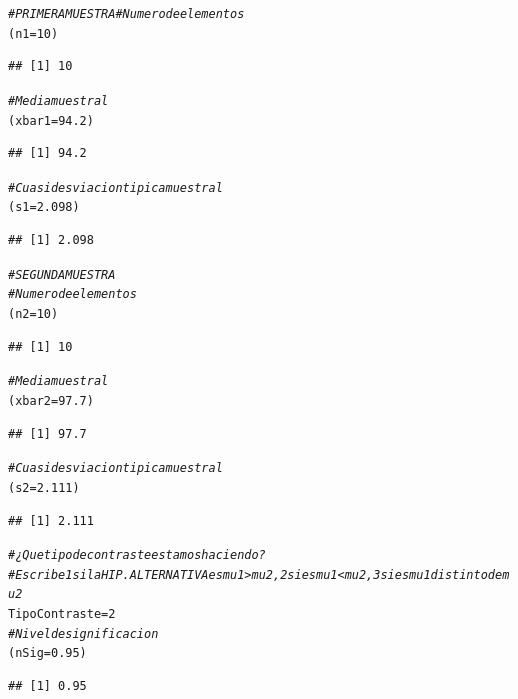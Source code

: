 \documentclass[10pt,a4paper]{article}\usepackage[]{graphicx}\usepackage[]{color}
\makeatletter
\newcommand{\hlnum}[1]{\textcolor[rgb]{0.686,0.059,0.569}{#1}}%
\newcommand{\hlcom}[1]{\textcolor[rgb]{0.678,0.584,0.686}{\textit{#1}}}%
\newcommand{\hlstd}[1]{\textcolor[rgb]{0.345,0.345,0.345}{#1}}%
\newcommand{\hlkwb}[1]{\textcolor[rgb]{0.69,0.353,0.396}{#1}}%
\newenvironment{kframe}{%
 \def\at@end@of@kframe{}%
 \ifinner\ifhmode%
  \def\at@end@of@kframe{\end{minipage}}%
  \begin{minipage}{\columnwidth}%
 \fi\fi%
 \def\FrameCommand##1{\hskip\@totalleftmargin \hskip-\fboxsep
 \colorbox{shadecolor}{##1}\hskip-\fboxsep
     \hskip-\linewidth \hskip-\@totalleftmargin \hskip\columnwidth}%
 \MakeFramed {\advance\hsize-\width
   \@totalleftmargin\z@ \linewidth\hsize
   \@setminipage}}%
 {\par\unskip\endMakeFramed%
 \at@end@of@kframe}
\newenvironment{knitrout}{}{} %
\newcounter {cont01}
\makeatother
\begin{document}
\begin{knitrout}
\color{fgcolor}\begin{kframe}
\begin{alltt}
 \hlcom{# PRIMERA MUESTRA # Numero de elementos}
 \hlstd{(n1} \hlkwb{=} \hlnum{10}\hlstd{)}
\end{alltt}
\begin{verbatim}
## [1] 10
\end{verbatim}
\begin{alltt}
 \hlcom{# Media muestral}
 \hlstd{(xbar1} \hlkwb{=} \hlnum{94.2}\hlstd{)}
\end{alltt}
\begin{verbatim}
## [1] 94.2
\end{verbatim}
\begin{alltt}
 \hlcom{# Cuasidesviacion tipica muestral}
 \hlstd{(s1} \hlkwb{=} \hlnum{2.098}\hlstd{)}
\end{alltt}
\begin{verbatim}
## [1] 2.098
\end{verbatim}
\begin{alltt}
 \hlcom{# SEGUNDA MUESTRA}
 \hlcom{# Numero de elementos}
 \hlstd{(n2} \hlkwb{=} \hlnum{10}\hlstd{)}
\end{alltt}
\begin{verbatim}
## [1] 10
\end{verbatim}
\begin{alltt}
 \hlcom{# Media muestral}
 \hlstd{(xbar2} \hlkwb{=} \hlnum{97.7}\hlstd{)}
\end{alltt}
\begin{verbatim}
## [1] 97.7
\end{verbatim}
\begin{alltt}
 \hlcom{# Cuasidesviacion tipica  muestral}
 \hlstd{(s2} \hlkwb{=} \hlnum{2.111}\hlstd{)}
\end{alltt}
\begin{verbatim}
## [1] 2.111
\end{verbatim}
\begin{alltt}
 \hlcom{# ¿Que tipo de contraste estamos haciendo?}
 \hlcom{# Escribe 1 si la HIP. ALTERNATIVA es mu1 > mu2, 2 si es mu1 < mu2, 3 si es mu1 distinto de mu2}
     \hlstd{TipoContraste} \hlkwb{=} \hlnum{2}
 \hlcom{#Nivel de significacion}
     \hlstd{(nSig} \hlkwb{=} \hlnum{0.95}\hlstd{)}
\end{alltt}
\begin{verbatim}
## [1] 0.95
\end{verbatim}
\end{kframe}
\end{knitrout}
\end{document}
